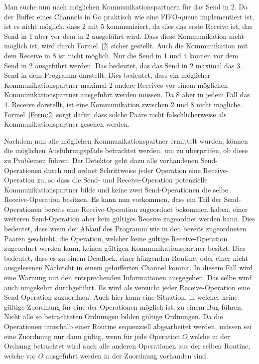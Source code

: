 Man suche nun nach möglichen Kommunikationspartnern für das Send in 2. 
Da der Buffer eines Channels in Go praktisch wie eine FIFO-queue implementiert
ist, ist es nicht möglich, dass 2 mit 5 kommuniziert, da dies das erste 
Receive ist, das Send in 1 aber vor dem in 2 ausgeführt wird. Dass diese 
Kommunikation nicht möglich ist, wird durch Formel~\ref{2} sicher gestellt.
Auch die Kommunikation mit dem Receive in 8 ist nicht möglich. Nur die Send in 
1 und 4 können vor dem Send in 2 ausgeführt werden. Das bedeutet, das das 
Send in 2 maximal das 3. Send in dem Programm darstellt. Dies bedeutet, 
dass ein möglicher Kommunikationspartner maximal 2 andere Receives vor einem 
möglichen Kommunikationspartner ausgeführt werden müssen. Da 8 aber in jedem 
Fall das 4. Receive darstellt, ist eine Kommunikation zwischen 2 und 8 nicht mögliche.
Formel~\ref{Form:2} sorgt dafür, dass solche Paare nicht fälschlicherweise 
als Kommunikationspartner gesehen werden.

Nachdem nun alle möglichen Kommunikationspartner ermittelt wurden, 
können die möglichen Ausführungspfade betrachtet werden, um zu überprüfen, 
ob diese zu Problemen führen. Der Detektor geht dazu alle vorhandenen Send-Operationen 
durch und ordnet Schrittweise jeder Operation eine Receive-Operation zu, so dass 
die Send- und Receive-Operation potenzielle Kommunikationspartner 
bilde und keine zwei Send-Operationen die selbe Receive-Operation 
besitzen. Es kann nun vorkommen, dass ein Teil der Send-Operationen bereits eine 
Receive-Operation zugeordnet bekommen haben, einer weiteren Send-Operation 
aber kein gültiges Receive zugeordnet werden kann. Dies bedeutet, dass 
wenn der Ablauf des Programm wie in den bereits zugeordneten Paaren geschieht, die Operation, 
welcher keine gültige Receive-Operation zugeordnet werden kann, keinen 
gültigen Kommunikationspartner besitzt. Dies bedeutet, dass es zu einem 
Deadlock, einer hängenden Routine, oder einer nicht ausgelesenen Nachricht 
in einem gebufferten Channel kommt. In diesem Fall wird eine Warnung 
mit den entsprechenden Informationen ausgegeben. Das selbe wird auch umgekehrt durchgeführt. Es wird als 
versucht jeder Receive-Operation eine Send-Operation zuzuordnen. 
Auch hier kann eine Situation, in welcher keine gültige Zuordnung für eine
der Operationen möglich ist, zu einem Bug führen.\\
Nicht alle so betrachteten Ordnungen bilden gültige Ordnungen.
Da die Operationen innerhalb einer Routine sequenziell abgearbeitet werden, 
müssen sei eine Zuordnung nur dann gültig, wenn für jede Operation $O$ 
welche in der Ordnung betrachtet wird auch alle anderen Operationen aus 
der selben Routine, welche vor $O$ ausgeführt werden in der Zuordnung 
vorhanden sind.

